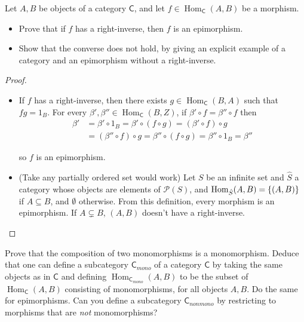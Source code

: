 \begin{exercise}{4.3}
	Let $A, B$ be objects of a category $\mathsf{C}$, and let $f\in \operatorname{Hom}_{\mathsf{C}}(A, B)$ be a morphism.
	\begin{itemize}
		\item Prove that if $f$ has a right-inverse, then $f$ is an epimorphism.
		\item Show that the converse does not hold, by giving an explicit example of a category and an epimorphism without a right-inverse.
	\end{itemize}
\end{exercise}

\begin{proof}
	\begin{itemize}
		\item If $f$ has a right-inverse, then there exists $g\in \operatorname{Hom}_{\mathsf{C}}(B, A)$ such that $fg = 1_{B}$. For every $\beta', \beta'' \in \operatorname{Hom}_{\mathsf{C}}(B, Z)$, if $\beta'\circ f = \beta''\circ f$ then
		      \begin{align*}
			      \beta' & = \beta'\circ 1_{B} = \beta'\circ (f\circ g) = (\beta'\circ f)\circ g              \\
			             & = (\beta''\circ f)\circ g = \beta''\circ (f\circ g) = \beta''\circ 1_{B} = \beta''
		      \end{align*}

		      so $f$ is an epimorphism.
		\item (Take any partially ordered set would work) Let $S$ be an infinite set and $\hat{S}$ a category whose objects are elements of $\mathscr{P}(S)$, and $\operatorname{Hom}_{\hat{S}}(A, B) = \left\{{(A, B)}\right\}$ if $A\subseteq B$, and $\emptyset$ otherwise. From this definition, every morphism is an epimorphism. If $A\subsetneq B$, $(A, B)$ doesn't have a right-inverse.
	\end{itemize}
\end{proof}

\begin{exercise}{4.4}
	Prove that the composition of two monomorphisms is a monomorphism. Deduce that one can define a subcategory ${\mathsf{C}}_{mono}$ of a category $\mathsf{C}$ by taking the same objects as in $\mathsf{C}$ and defining $\operatorname{Hom}_{{\mathsf{C}}_{mono}}(A, B)$ to be the subset of $\operatorname{Hom}_{\mathsf{C}}(A, B)$ consisting of monomorphisms, for all objects $A, B$. Do the same for epimorphisms. Can you define a subcategory $\mathsf{C}_{nonmono}$ by restricting to morphisms that are \textit{not} monomorphisms?
\end{exercise}

